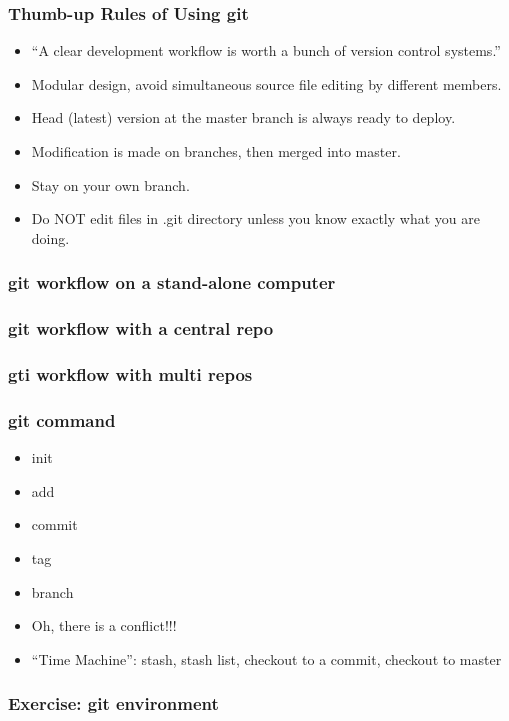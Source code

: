 \documentclass[14pt]{beamer}
\begin{document}
\begin{frame}\frametitle{Thumb-up Rules of Using git}

\begin{itemize}
\item
  ``A clear development workflow is worth a bunch of version control
  systems.''
\item
  Modular design, avoid simultaneous source file editing by different
  members.
\item
  Head (latest) version at the master branch is always ready to deploy.
\item
  Modification is made on branches, then merged into master.
\item
  Stay on your own branch.
\item
  Do NOT edit files in .git directory unless you know exactly what you
  are doing. 
\end{itemize}
\end{frame}

\begin{frame}\frametitle{git workflow on a stand-alone computer}

\end{frame}

\begin{frame}\frametitle{git workflow with a central repo}

\end{frame}

\begin{frame}\frametitle{gti workflow with multi repos}

\end{frame}

\begin{frame}\frametitle{git command}

\begin{itemize}
\item
  init
\item
  add
\item
  commit
\item
  tag
\item
  branch
\item
  Oh, there is a conflict!!!
\item
  ``Time Machine'': stash, stash list, checkout to a commit, checkout to
  master
\end{itemize}
\end{frame}

\begin{frame}\frametitle{Exercise: git environment}

\end{frame}
\end{document}
